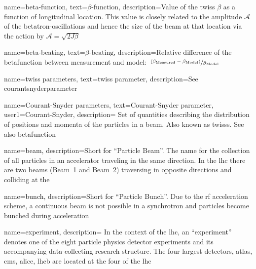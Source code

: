 {
        name={beta-function},
        text=\ensuremath{\beta\text{-function}},
        description={Value of the \gls{twiss} $\beta$ as a function of longitudinal location.
        This value is closely related to the amplitude $\mathcal{A}$ of the betatron-oscillations
        and hence the size of the \gls{beam} at that location via the \gls{action}  
        by $\mathcal{A} = \sqrt{2J\beta}$%
        }
}

{
        name={beta-beating},
        text=\ensuremath{\beta\text{-beating}},
        description={Relative difference of the \gls{betafunction}
        between measurement and model: $\sfrac{\left(\beta_\text{Measured} - \beta_\text{Model}\right)}{\beta_\text{Model}}$
        }
}


{
        name={twiss parameters},
        text={twiss parameter},
        description={See \gls{courantsnyderparameter}}
}

{
        name={Courant-Snyder parameters},
        text={Courant-Snyder parameter},
        user1={Courant-Snyder},
        description={
            Set of quantities describing the distribution of 
            positions and momenta of the particles in a \gls{beam}.
            Also known as \glspl{twiss}. See also \gls{betafunction}
        }
}

{
        name=beam,
        description={Short for ``Particle Beam''. 
        The name for the collection of all particles in an accelerator traveling in the same direction.
        In the \acrfull{lhc} there are two beams (Beam~1 and Beam~2) traversing in opposite directions
        and colliding at the }
}

{
        name=bunch,
        description={Short for ``Particle Bunch''.
        Due to the \acrshort{rf} acceleration scheme, a continuous \gls{beam} is not possible in a
        synchrotron and particles become bunched during acceleration}
}


{
        name=experiment,
        description={
            In the context of the \acrfull{lhc}, an ``experiment'' denotes 
            one of the eight particle physics detector experiments   
            and its accompanying data-collecting research structure.
            The four largest detectors, \acrshort{atlas}, \acrshort{cms}, \acrshort{alice}, \acrshort{lhcb} 
            are located at the four  of the \acrshort{lhc}%
        }
}

